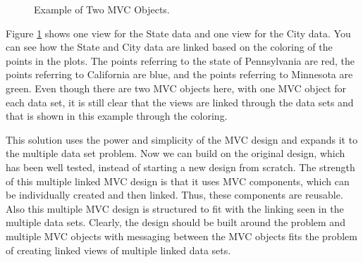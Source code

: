 \documentclass{article}[11pt]
\begin{document}
\begin{figure}[ht]
  \begin{center}
    \caption{ Example of Two MVC Objects. }
    \label{Fig:MultMVC}
  \end{center}
\end{figure}

Figure \ref{Fig:MultMVC} shows one view for the State data and one view
for the City data.  You can see how the State and City data are linked based
on the coloring of the points in the plots.  The points referring to the state
of Pennsylvania are red, the points referring to California are blue, and the
points referring to Minnesota are green.  Even though there are two MVC
objects here, with one MVC object for each data set, it is still clear that
the views are linked through the data sets and that is shown in this example
through the coloring.

This solution uses the power and simplicity of the MVC design and expands it
to the multiple data set problem.  Now we can build on the original design,
which has been well tested, instead of starting a new design from scratch.
The strength of this multiple linked MVC design is that it uses MVC
components, which can be individually created and then linked.  Thus, these
components are reusable.  Also this multiple MVC design is structured to fit
with the linking seen in the multiple data sets.  Clearly, the design should
be built around the problem and multiple MVC objects with messaging between
the MVC objects fits the problem of creating linked views of multiple linked
data sets. 
\end{document}
